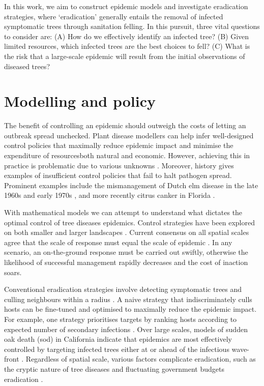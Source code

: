 In this work, we aim to construct epidemic models and investigate eradication strategies, 
where `eradication' generally entails the removal of infected symptomatic trees through sanitation felling. 
In this pursuit, three vital questions to consider are: 
(A) How do we effectively identify an infected tree? 
(B) Given limited resources, which infected trees are the best choices to fell? 
(C) What is the risk that a large-scale epidemic will result from the initial observations of diseased trees?

\section{Modelling and policy}
\label{sec:modelling-and-policy}


The benefit of controlling an epidemic should outweigh the costs of letting an outbreak spread unchecked. 
Plant disease modellers can help infer well-designed control policies that maximally reduce epidemic impact and minimise the expenditure
of resources\textemdash both natural and economic. However, achieving this in practice is problematic due to various unknowns \cite{13-challenges}.
Moreover, history gives examples of insufficient control policies that fail to halt pathogen spread. 
Prominent examples include the mismanagement of Dutch elm disease in the late 1960s and early 1970s \cite{dutch-elm-mismanage}, and more recently citrus canker in Florida \cite{schubert2001meeting}.

With mathematical models we can attempt to understand what dictates the optimal control of tree diseases epidemics. 
Control strategies have been explored on both smaller \cite{risk-potential-control} 
and larger landscapes \cite{large-scale-control2}. Current consensus on all spatial scales
agree that the scale of response must equal the scale of epidemic \cite{control-scale-matching}. In any scenario, 
an on-the-ground response must be carried out swiftly, otherwise the likelihood of successful management rapidly decreases and the cost of inaction soars.

Conventional eradication strategies involve detecting symptomatic trees and culling neighbours within a radius \cite{WEBIDEMICS}.
A naive strategy that indiscriminately culls hosts can be fine-tuned and optimised to maximally reduce the epidemic impact. 
For example, one strategy prioritises targets by ranking hosts according to expected number of secondary infections \cite{risk-potential-control}.
Over large scales, models of sudden oak death (\acrshort{sod}) in California indicate that epidemics are most effectively controlled by targeting infected trees either at or ahead of the infectious wave-front \cite{large-scale-control}.
Regardless of spatial scale, various factors complicate eradication, such as the cryptic nature of tree diseases and fluctuating government budgets eradication \cite{control-theory, control-theory-application}.


